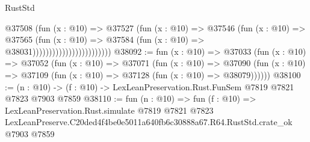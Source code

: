 \begin{lexlean}{RustStd}
\begin{coremodule}
                                        @37508
                                          (fun (x : @10) =>
                                          @37527
                                            (fun (x : @10) =>
                                            @37546
                                              (fun (x : @10) =>
                                              @37565
                                                (fun (x : @10) =>
                                                @37584
                                                  (fun (x : @10) => @38031))))))))))))))))))))))))
@38092 := fun (x : @10) =>
  @37033
    (fun (x : @10) =>
    @37052
      (fun (x : @10) =>
      @37071
        (fun (x : @10) =>
        @37090 (fun (x : @10) => @37109 (fun (x : @10) => @37128 (fun (x : @10) => @38079))))))
@38100 := (n : @10) -> (f : @10) -> LexLeanPreservation.Rust.FunSem @7819 @7821 @7823 @7903 @7859
@38110 := fun (n : @10) =>
  fun (f : @10) =>
  LexLeanPreservation.Rust.simulate
    @7819
    @7821
    @7823
    LexLeanPreserve.C20ded4f4be0e5011a640fb6c30888a67.R64.RustStd.crate_ok
    @7903
    @7859
\end{coremodule}
\end{lexlean}
